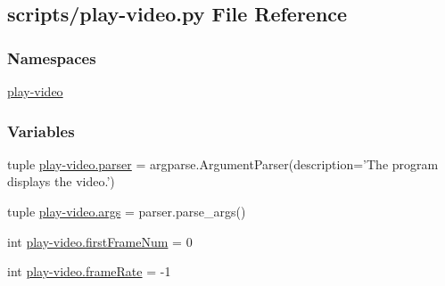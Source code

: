 \hypertarget{play-video_8py}{\subsection{scripts/play-\/video.py File Reference}
\label{play-video_8py}
}
\subsubsection*{Namespaces}
\begin{DoxyCompactItemize}
\item 
\hyperlink{namespaceplay-video}{play-\/video}
\end{DoxyCompactItemize}
\subsubsection*{Variables}
\begin{DoxyCompactItemize}
\item 
tuple \hyperlink{namespaceplay-video_a96130bca428a51e38a074bd472f58345}{play-\/video.\-parser} = argparse.\-Argument\-Parser(description='The program displays the video.')
\item 
tuple \hyperlink{namespaceplay-video_a3d22c1d9d5993f4571eda1a381b008ce}{play-\/video.\-args} = parser.\-parse\-\_\-args()
\item 
int \hyperlink{namespaceplay-video_a02736d75444e0d9051079c55cd648d58}{play-\/video.\-first\-Frame\-Num} = 0
\item 
int \hyperlink{namespaceplay-video_ae12c2e1c8988e73e97b2d64060e8a853}{play-\/video.\-frame\-Rate} = -\/1
\end{DoxyCompactItemize}
